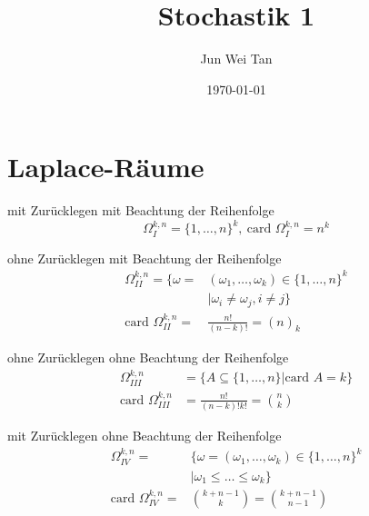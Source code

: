 \documentclass[prb,12pt, twocolumn]{revtex4-2}
\theoremstyle{definition}
\theoremstyle{definition}
\theoremstyle{definition}
\begin{document}
	\title{Stochastik 1}
	\author{Jun Wei Tan}
	\date{\today}
	\maketitle
	\section{Laplace-Räume}
	\begin{Note}
		mit Zurücklegen mit Beachtung der Reihenfolge
		\[\Omega_I^{k,n}=\{1,\dots, n\}^k,~\text{card }\Omega_I^{k,n} = n^k\]
	\end{Note}
	\begin{Note}
		ohne Zurücklegen mit Beachtung der Reihenfolge
		\begin{align*}
		\Omega_{II}^{k,n}=\{\omega =& (\omega_1, \dots, \omega_k)\in \{1,\dots, n\}^k\\
		&|\omega_i \neq \omega_j, i\neq j\}\\
		\text{card }\Omega_{II}^{k,n} =&\frac{n!}{(n-k)!}=(n)_k
		\end{align*}
	\end{Note}
	\begin{Note}
		ohne Zurücklegen ohne Beachtung der Reihenfolge
		\begin{align*}
		\Omega_{III}^{k,n}&=\{A\subseteq \{1,\dots, n\}|\text{card }A=k\}\\
		\text{card }\Omega_{III}^{k,n}&=\frac{n!}{(n-k)!k!}=\binom{n}{k}
	\end{align*}
	\end{Note}
	\begin{Note}
		mit Zurücklegen ohne Beachtung der Reihenfolge
		\begin{align*}
			\Omega_{IV}^{k, n}=&\{\omega=(\omega_1, \dots, \omega_k)\in \{1, \dots, n\}^k\\
			&|\omega_1\le \dots \le \omega_k\}\\
			\text{card }\Omega_{IV}^{k,n}=&\binom{k+n-1}{k}=\binom{k+n-1}{n-1}
		\end{align*}
	\end{Note}
\end{document}
